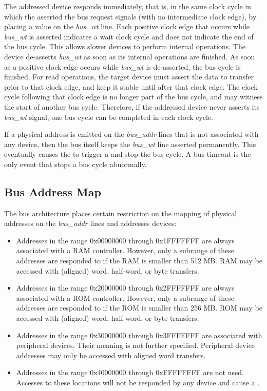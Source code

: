 The addressed device responds immediately, that is, in the same clock cycle in which the \eco asserted the bus request signals (with no intermediate clock edge), by placing a value on the {\it bus\_wt} line. Each positive clock edge that occurs while {\it bus\_wt} is asserted indicates a wait clock cycle and does not indicate the end of the bus cycle. This allows slower devices to perform internal operations. The device de-asserts {\it bus\_wt} as soon as its internal operations are finished. As soon as a positive clock edge occurs while {\it bus\_wt} is de-asserted, the bus cycle is finished. For read operations, the target device must assert the data to transfer prior to that clock edge, and keep it stable until after that clock edge. The clock cycle following that clock edge is no longer part of the bus cycle, and may witness the start of another bus cycle. Therefore, if the addressed device never asserts its {\it bus\_wt} signal, one bus cycle can be completed in each clock cycle.

If a physical address is emitted on the {\it bus\_addr} lines that is not associated with any device, then the bus itself keeps the {\it bus\_wt} line asserted permanently. This eventually causes the \eco to trigger a  and stop the bus cycle. A bus timeout is the only event that stops a bus cycle abnormally.

\subsection{Bus Address Map}

The bus architecture places certain restriction on the mapping of physical addresses on the {\it bus\_addr} lines and addresses devices:
\begin{itemize}
\item Addresses in the range 0x00000000 through 0x1FFFFFFF are always associated with a RAM controller. However, only a subrange of these addresses are responded to if the RAM is smaller than 512 MB. RAM may be accessed with (aligned) word, half-word, or byte transfers.
\item Addresses in the range 0x20000000 through 0x2FFFFFFF are always associated with a ROM controller. However, only a subrange of these addresses are responded to if the ROM is smaller than 256 MB. ROM may be accessed with (aligned) word, half-word, or byte transfers.
\item Addresses in the range 0x30000000 through 0x3FFFFFFF are associated with peripheral devices. Their meaning is not further specified. Peripheral device addresses may only be accessed with aligned word transfers.
\item Addresses in the range 0x40000000 through 0xFFFFFFFF are not used. Accesses to these locations will not be responded by any device and cause a .
\end{itemize}

